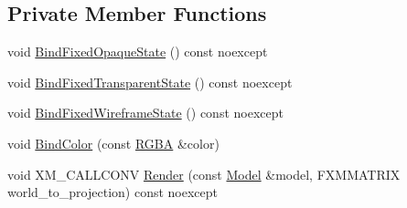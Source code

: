\subsection*{Private Member Functions}
\begin{DoxyCompactItemize}
\item 
void \mbox{\hyperlink{classmage_1_1rendering_1_1_forward_pass_af66584e7efc3565f23f7b5940d6f35eb}{Bind\+Fixed\+Opaque\+State}} () const noexcept
\item 
void \mbox{\hyperlink{classmage_1_1rendering_1_1_forward_pass_aefd3217115558f90b92a1521adfb8bb8}{Bind\+Fixed\+Transparent\+State}} () const noexcept
\item 
void \mbox{\hyperlink{classmage_1_1rendering_1_1_forward_pass_a1d5c1efa0b532674124a264f61f75a07}{Bind\+Fixed\+Wireframe\+State}} () const noexcept
\item 
void \mbox{\hyperlink{classmage_1_1rendering_1_1_forward_pass_a1431c5d2bd8cccc55427aa1cf9a64845}{Bind\+Color}} (const \mbox{\hyperlink{structmage_1_1_r_g_b_a}{R\+G\+BA}} \&color)
\item 
void X\+M\+\_\+\+C\+A\+L\+L\+C\+O\+NV \mbox{\hyperlink{classmage_1_1rendering_1_1_forward_pass_a44354b5b6ccfe27fdc436a37da34c47e}{Render}} (const \mbox{\hyperlink{classmage_1_1rendering_1_1_model}{Model}} \&model, F\+X\+M\+M\+A\+T\+R\+IX world\+\_\+to\+\_\+projection) const noexcept
\end{DoxyCompactItemize}
